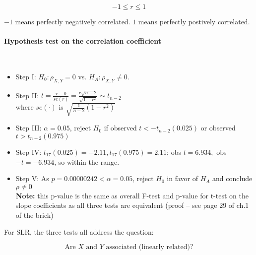 \documentclass[a4paper, 11pt, twoside]{article}
\begin{document}
\[-1\leq r\leq 1\]

$-1$ means perfectly negatively correlated. $1$ means perfectly postively correlated.

\paragraph{Hypothesis test on the correlation coefficient}\ \\

\begin{itemize}
	\item Step I: $H_0: \rho_{X,Y}=0$ vs. $H_A: \rho_{X,Y} \not = 0.$
	\item Step II: $t=\frac{r-0}{se(r)}=\frac{r\sqrt{n-2}}{\sqrt{1-r^2}}\sim t_{n-2}$\\
	where $se(\cdot)$ is $\sqrt{\frac{1}{n-2}(1-r^2)}$
	\item Step III: $\alpha=0.05$, reject $H_0$ if observed $t < -t_{n-2}(0.025)$ or observed $t > t_{n-2}(0.975)$
	\item Step IV: $t_{17}(0.025)=-2.11, t_{17}(0.975)=2.11$; obs $t=6.934,$ obs $-t=-6.934$, so within the range.
	\item Step V: As $p=0.00000242 < \alpha = 0.05$, reject $H_0$ in favor of $H_A$ and conclude $\rho\not =0$\\
	\textbf{Note:} this p-value is the same as overall F-test and p-value for t-test on the slope coefficients as all three tests are equivalent (proof -- see page 29 of ch.1 of the brick)
\end{itemize}

For SLR, the three tests all address the question:

\[\text{Are $X$ and $Y$ associated (linearly related)?}\]
\end{document}
